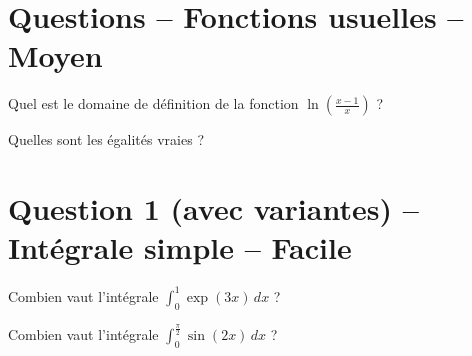 \documentclass[12pt,a4paper]{article}
\begin{document}
\section{Questions -- Fonctions usuelles -- Moyen}

\begin{question}
Quel est le domaine de définition de la fonction $\ln\left(\frac{x-1}{x}\right)$ ?
\begin{answers} 
    \good{$]0,1[$}
    \bad{$]-\infty,0[ \cup ]1,+\infty[$}
\end{answers}
\end{question}


\begin{question}
Quelles sont les égalités vraies ?
\begin{answers} 
\end{answers}
\end{question}


\section{Question 1 (avec variantes) -- Intégrale simple -- Facile}


\begin{question}

Combien vaut l'intégrale $\int_0^1 \exp(3x)\,dx$ ?


\begin{answers}  
\end{answers}
\end{question}


\begin{question}

Combien vaut l'intégrale $\int_0^{\frac\pi2} \sin(2x)\,dx$ ?


\begin{answers}  
    \bad{$\pi$}
\end{answers}
\end{question}
\end{document}

